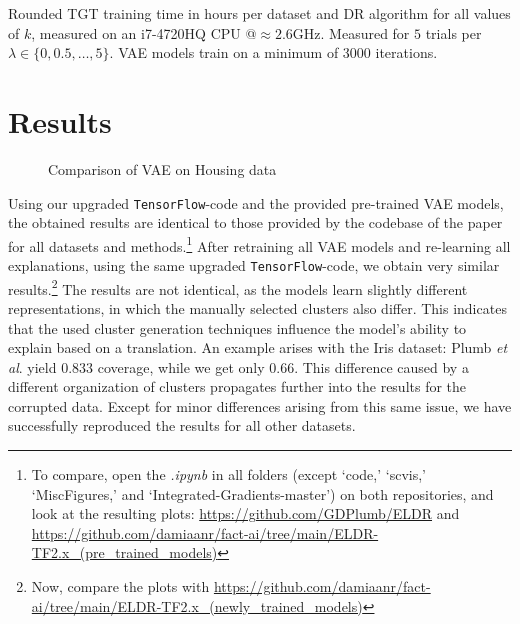 \begin{table}[h]
  \centering
  
  \caption{Rounded TGT training time in hours per dataset and DR algorithm for all values of $k$, measured on an i7-4720HQ CPU @$\approx2.6$GHz. Measured for $5$ trials per $\lambda \in \{0, 0.5,  \ldots , 5\}$. VAE models train on a minimum of 3000 iterations.}
\end{table}

\section{Results}
\begin{figure}
  \caption{Comparison of VAE on Housing data}
\end{figure}

Using our upgraded \texttt{TensorFlow}-code and the provided pre-trained VAE models, the obtained results are identical to those provided by the codebase of the paper for all datasets and methods.\footnote{To compare, open the \textit{.ipynb} in all folders (except `code,' `scvis,' `MiscFigures,' and `Integrated-Gradients-master') on both repositories, and look at the resulting plots: \url{https://github.com/GDPlumb/ELDR} and \url{https://github.com/damiaanr/fact-ai/tree/main/ELDR-TF2.x_(pre_trained_models)}} After retraining all VAE models and re-learning all explanations, using the same upgraded \texttt{TensorFlow}-code, we obtain very similar results.\footnote{Now, compare the plots with \url{https://github.com/damiaanr/fact-ai/tree/main/ELDR-TF2.x_(newly_trained_models)}} The results are not identical, as the models learn slightly different representations, in which the manually selected clusters also differ. This indicates that the used cluster generation techniques influence the model's ability to explain based on a translation. An example arises with the Iris dataset: Plumb \textit{et al}. yield $0.833$ coverage, while we get only $0.66$. This difference caused by a different organization of clusters propagates further into the results for the corrupted data. Except for minor differences arising from this same issue, we have successfully reproduced the results for all other datasets.\\

